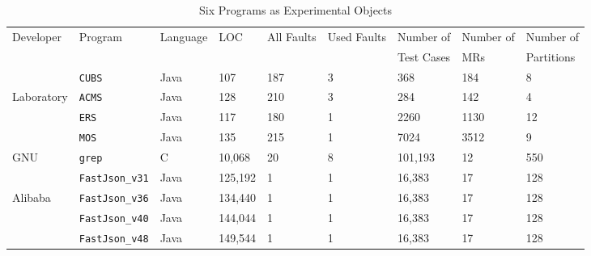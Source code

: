 \documentclass[10pt,journal,compsoc]{IEEEtran}
\begin{document}
\begin{table}[hbt]
  \caption{Six Programs as Experimental Objects}
  \label{table:objects}
  \centering
  \begin{tabular}{lllllllll} \toprule
  \multirow{2}{*}{Developer}&\multirow{2}{*}{Program}&\multirow{2}{*}{Language}&\multirow{2}{*}{LOC}&\multirow{2}{*}{All Faults}
  &\multirow{2}{*}{Used Faults} &Number of &Number of  &Number of  \\
  & & & &          &            &Test Cases&MRs        &Partitions\\ \midrule
                                &\texttt{CUBS}        &Java      &107     &187        &3    &368     &184        &8 \\
  \multirow{2}{*}{Laboratory}   &\texttt{ACMS}        &Java      &128     &210        &3    &284     &142        &4 \\
								&\texttt{ERS}         &Java      &117     &180        &1    &2260     &1130       &12 \\
								&\texttt{MOS}         &Java      &135     &215        &1    &7024     &3512       &9  \\ \midrule
  GNU                           &\texttt{grep}        &C         &10,068  &20         &8    &101,193 &12         &550 \\ \midrule
                                &\texttt{FastJson\_v31}    &Java      &125,192  &1          &1    &16,383  &17         &128 \\
  \multirow{2}{*}{Alibaba}      &\texttt{FastJson\_v36}    &Java      &134,440  &1          &1    &16,383  &17         &128 \\
                                &\texttt{FastJson\_v40}    &Java      &144,044  &1          &1    &16,383  &17         &128 \\
                                &\texttt{FastJson\_v48}    &Java      &149,544  &1          &1    &16,383  &17         &128 \\ \bottomrule
  \end{tabular}
\end{table}
\end{document}
